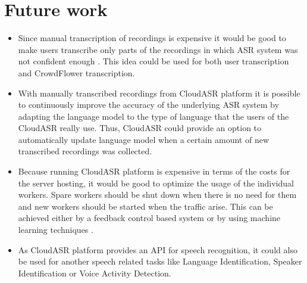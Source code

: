 \section*{Future work}
\begin{itemize}
  \item
    Since manual transcription of recordings is expensive
      it would be good to make users transcribe only parts of the recordings
      in which ASR system was not confident enough \cite{sperber2014fly}.
    This idea could be used for both user transcription and CrowdFlower transcription.

  \item
    With manually transcribed recordings from CloudASR platform
      it is possible to continuously improve the accuracy of the underlying ASR system
      by adapting the language model to the type of language that the users of the CloudASR really use.
    Thus, CloudASR could provide an option to automatically update language model
      when a certain amount of new transcribed recordings was collected.

  \item
    Because running CloudASR platform is expensive in terms of the costs for the server hosting,
      it would be good to optimize the usage of the individual workers.
    Spare workers should be shut down when there is no need for them
      and new workers should be started when the traffic arise.
    This can be achieved either by a feedback control based system \cite{janert2013feedback}
      or by using machine learning techniques \cite{gong2010press}.

  \item
    As CloudASR platform provides an API for speech recognition,
      it could also be used for another speech related tasks like Language Identification, Speaker Identification or Voice Activity Detection.

\end{itemize}


